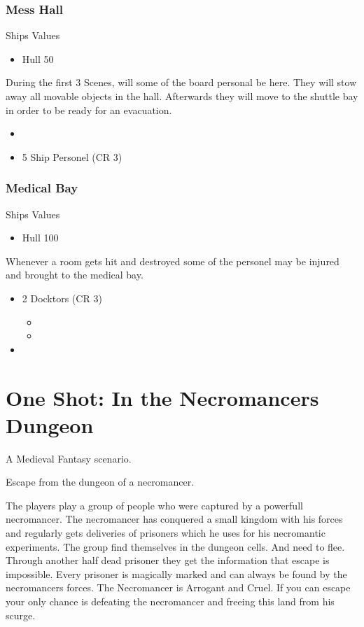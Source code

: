 \documentclass[11pt]{article}
\begin{document}
{\subsubsection{Mess Hall}
\label{sec:orgfb89b3f}
Ships Values
\begin{itemize}
\item Hull 50
\end{itemize}

During the first 3 Scenes, will some of the board personal be here. They will stow away all movable objects in the hall. Afterwards they will move to the shuttle bay in order to be ready for an evacuation.

\begin{itemize}
\item \aspect{}
\item 5 Ship Personel (CR 3)
\end{itemize}
\subsubsection{Medical Bay}
\label{sec:orgfcf1e0a}
Ships Values
\begin{itemize}
\item Hull 100
\end{itemize}

Whenever a room gets hit and destroyed some of the personel may be injured and brought to the medical bay. 

\begin{itemize}
\item 2 Docktors (CR 3)
\begin{itemize}
\item {}
\item {}
\end{itemize}
\item {}
\end{itemize}
\section{One Shot: In the Necromancers Dungeon}
\label{sec:org82e0e1d}

A Medieval Fantasy scenario.

Escape from the dungeon of a necromancer.

The players play a group of people who were captured by a powerfull necromancer. The necromancer has conquered a small kingdom with his forces and regularly gets deliveries of prisoners which he uses for his necromantic experiments. The group find themselves in the dungeon cells. And need to flee. Through another half dead prisoner they get the information that escape is impossible. Every prisoner is magically marked and can always be found by the necromancers forces. The Necromancer is Arrogant and Cruel. If you can escape your only chance is defeating the necromancer and freeing this land from his scurge.  
}
\end{document}
